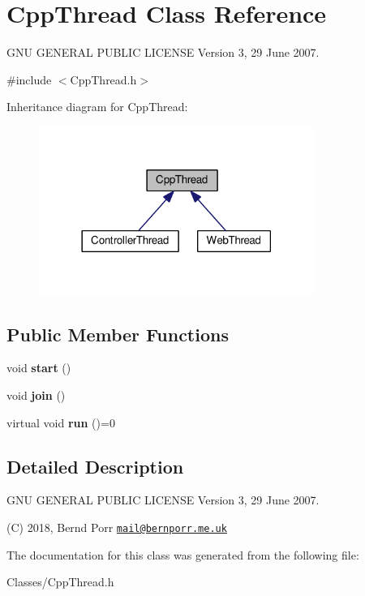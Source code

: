\hypertarget{classCppThread}{}\section{Cpp\+Thread Class Reference}
\label{classCppThread}


G\+NU G\+E\+N\+E\+R\+AL P\+U\+B\+L\+IC L\+I\+C\+E\+N\+SE Version 3, 29 June 2007.  




{\ttfamily \#include $<$Cpp\+Thread.\+h$>$}



Inheritance diagram for Cpp\+Thread\+:\nopagebreak
\begin{figure}[H]
\begin{center}
\leavevmode
\includegraphics[width=254pt]{classCppThread__inherit__graph}
\end{center}
\end{figure}
\subsection*{Public Member Functions}
\begin{DoxyCompactItemize}
\item 
\mbox{\label{classCppThread_a1be46d1be000f41a763289300623c609}} 
void {\bfseries start} ()
\item 
\mbox{\label{classCppThread_a8ff0fda6b913cc53764caef0e1200f3f}} 
void {\bfseries join} ()
\item 
\mbox{\label{classCppThread_a792b79e72250710147c452648def4a78}} 
virtual void {\bfseries run} ()=0
\end{DoxyCompactItemize}


\subsection{Detailed Description}
G\+NU G\+E\+N\+E\+R\+AL P\+U\+B\+L\+IC L\+I\+C\+E\+N\+SE Version 3, 29 June 2007. 

(C) 2018, Bernd Porr \href{mailto:mail@bernporr.me.uk}{\tt mail@bernporr.\+me.\+uk} 

The documentation for this class was generated from the following file\+:\begin{DoxyCompactItemize}
\item 
Classes/Cpp\+Thread.\+h\end{DoxyCompactItemize}
